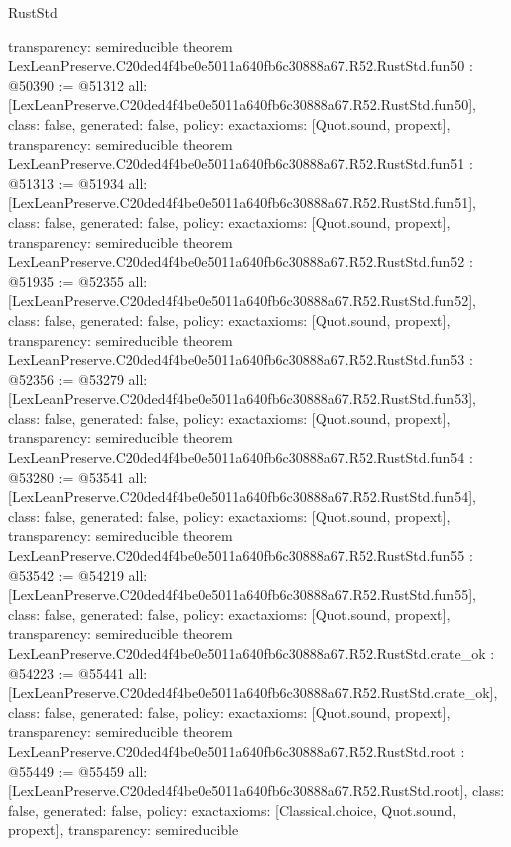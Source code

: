 \begin{lexlean}{RustStd}
\begin{coremodule}
{  transparency: semireducible
}
theorem LexLeanPreserve.C20ded4f4be0e5011a640fb6c30888a67.R52.RustStd.fun50 : @50390 := @51312 {
  all: [LexLeanPreserve.C20ded4f4be0e5011a640fb6c30888a67.R52.RustStd.fun50],
  class: false,
  generated: false,
  policy: exact{axioms: [Quot.sound, propext]},
  transparency: semireducible
}
theorem LexLeanPreserve.C20ded4f4be0e5011a640fb6c30888a67.R52.RustStd.fun51 : @51313 := @51934 {
  all: [LexLeanPreserve.C20ded4f4be0e5011a640fb6c30888a67.R52.RustStd.fun51],
  class: false,
  generated: false,
  policy: exact{axioms: [Quot.sound, propext]},
  transparency: semireducible
}
theorem LexLeanPreserve.C20ded4f4be0e5011a640fb6c30888a67.R52.RustStd.fun52 : @51935 := @52355 {
  all: [LexLeanPreserve.C20ded4f4be0e5011a640fb6c30888a67.R52.RustStd.fun52],
  class: false,
  generated: false,
  policy: exact{axioms: [Quot.sound, propext]},
  transparency: semireducible
}
theorem LexLeanPreserve.C20ded4f4be0e5011a640fb6c30888a67.R52.RustStd.fun53 : @52356 := @53279 {
  all: [LexLeanPreserve.C20ded4f4be0e5011a640fb6c30888a67.R52.RustStd.fun53],
  class: false,
  generated: false,
  policy: exact{axioms: [Quot.sound, propext]},
  transparency: semireducible
}
theorem LexLeanPreserve.C20ded4f4be0e5011a640fb6c30888a67.R52.RustStd.fun54 : @53280 := @53541 {
  all: [LexLeanPreserve.C20ded4f4be0e5011a640fb6c30888a67.R52.RustStd.fun54],
  class: false,
  generated: false,
  policy: exact{axioms: [Quot.sound, propext]},
  transparency: semireducible
}
theorem LexLeanPreserve.C20ded4f4be0e5011a640fb6c30888a67.R52.RustStd.fun55 : @53542 := @54219 {
  all: [LexLeanPreserve.C20ded4f4be0e5011a640fb6c30888a67.R52.RustStd.fun55],
  class: false,
  generated: false,
  policy: exact{axioms: [Quot.sound, propext]},
  transparency: semireducible
}
theorem LexLeanPreserve.C20ded4f4be0e5011a640fb6c30888a67.R52.RustStd.crate_ok : @54223 := @55441 {
  all: [LexLeanPreserve.C20ded4f4be0e5011a640fb6c30888a67.R52.RustStd.crate_ok],
  class: false,
  generated: false,
  policy: exact{axioms: [Quot.sound, propext]},
  transparency: semireducible
}
theorem LexLeanPreserve.C20ded4f4be0e5011a640fb6c30888a67.R52.RustStd.root : @55449 := @55459 {
  all: [LexLeanPreserve.C20ded4f4be0e5011a640fb6c30888a67.R52.RustStd.root],
  class: false,
  generated: false,
  policy: exact{axioms: [Classical.choice, Quot.sound, propext]},
  transparency: semireducible
}


\end{coremodule}
\end{lexlean}
